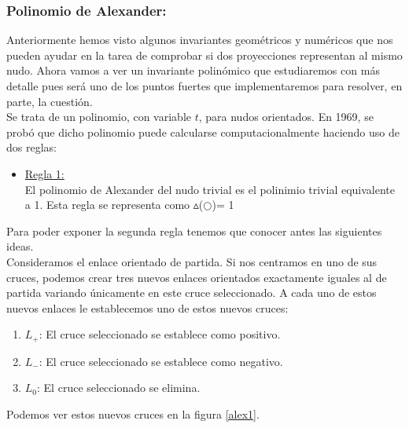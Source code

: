 \documentclass[14pt]{extarticle}
\begin{document}
\bigskip
\begin{center}
	\item \subsubsection{Polinomio de Alexander:}
\end{center}
Anteriormente hemos visto algunos invariantes geométricos y numéricos que nos pueden ayudar en la tarea de comprobar si dos proyecciones representan al mismo nudo. Ahora vamos a ver un invariante polinómico que estudiaremos con más detalle pues será uno de los puntos fuertes que implementaremos para resolver, en parte, la cuestión. \\

Se trata de un polinomio, con variable $t$, para nudos orientados. En 1969, se probó que dicho polinomio puede calcularse computacionalmente haciendo uso de dos reglas:
\begin{itemize}
	\item \underline{Regla 1:} \\
	El polinomio de Alexander del nudo trivial es el polinimio trivial equivalente a 1. Esta regla se representa como $\vartriangle$($\bigcirc$)= 1
\end{itemize}

Para poder exponer la segunda regla tenemos que conocer antes las siguientes ideas. \\
Consideramos el enlace orientado de partida. Si nos centramos en uno de sus cruces, podemos crear tres nuevos enlaces orientados exactamente iguales al de partida variando únicamente en este cruce seleccionado. A cada uno de estos nuevos enlaces le establecemos uno de estos nuevos cruces:
\begin{enumerate}
	\item $L_{+}$: El cruce seleccionado se establece como positivo.
	\item $L_{-}$: El cruce seleccionado se establece como negativo.
	\item $L_{0}$: El cruce seleccionado se elimina.
\end{enumerate}
Podemos ver estos nuevos cruces en la figura \ref{alex1}.\\
\end{document}
